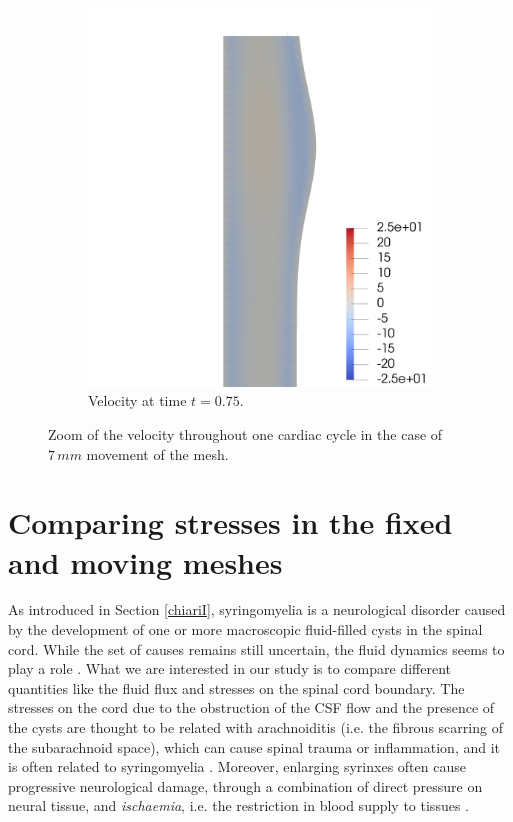 \documentclass[a4paper,11pt,openright,twoside]{book}
\begin{document}
\begin{figure}[h!]
\begin{subfigure}[b]{0.5\linewidth}
    \includegraphics[width=1.2\linewidth]{images/velocity_50_075.png} 
        \centering
    \caption{Velocity at time $t = 0.75$.} 
    \label{fig3:d} 
  \end{subfigure} 
  \centering
  \caption{Zoom of the velocity throughout one cardiac cycle in the case of $7 \, mm$ movement of the mesh.}
  \label{fig3} 
\end{figure}

\newpage

\section{Comparing stresses in the fixed and moving meshes}
As introduced in Section \ref{chiariI}, syringomyelia is a neurological disorder caused by the development of one or more macroscopic fluid-filled cysts in the spinal cord. While the set of causes remains still uncertain, the fluid dynamics seems to play a role \cite{elliott}. What we are interested in our study is to compare different quantities like the fluid flux and stresses on the spinal cord boundary. The stresses on the cord due to the obstruction of the CSF flow and the presence of the cysts are thought to be related with arachnoiditis (i.e. the fibrous scarring of the subarachnoid space), which can cause spinal trauma or inflammation, and it is often related to syringomyelia \cite{bertram}. Moreover, enlarging syrinxes often cause progressive neurological damage, through a combination of direct pressure on neural tissue, and \emph{ischaemia}, i.e. the restriction in blood supply to tissues \cite{elliott}.
\end{document}
